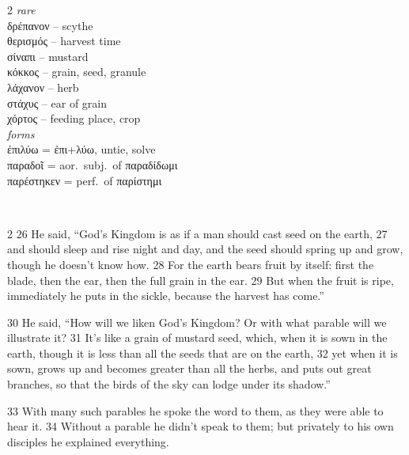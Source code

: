 \documentclass[10pt,a5paper,twoside,twocolumn]{book}
\newcommand*\cleartoleftpage{%
  \ifodd\value{page}\hbox{}\clearpage\fi
}
\newcommand{\separator}{
  \vspace{-0.5\baselineskip}%
  \hspace{0.27\textwidth}%
  \noindent\makebox[\linewidth]{\resizebox{0.3333\linewidth}{1pt}{$\bullet$}}\bigskip%
  \vspace{-0.5\baselineskip}
}
\newenvironment{facing}{\cleartoleftpage}{\clearpage\pagebreak}
\newenvironment{help}{\clearpage}{}
\newenvironment{helpsec}{\begin{minipage}[t]{\textwidth}\begin{multicols}{2}}{\end{multicols}\end{minipage}}
\newenvironment{vocab}{\begin{helpsec}}{\end{helpsec}}
\newenvironment{translation}{\separator\\\begin{helpsec}\footnotesize}{\end{helpsec}}
\begin{document}
\begin{facing}
\begin{help}
\begin{vocab}
\emph{rare}\\
δρέπανον -- scythe\\
θερισμός -- harvest time\\
σίναπι -- mustard \\
κόκκος -- grain, seed, granule\\
λάχανον -- herb\\
στάχυς -- ear of grain\\
χόρτος -- feeding place, crop\\

\emph{forms}\\
ἐπιλύω = ἐπι+λύω, untie, solve\\
παραδοῖ = aor.~subj.~of παραδίδωμι\\
παρέστηκεν = perf.~of παρίστημι\\

\end{vocab}
\begin{translation}
 26 He said, ``God's Kingdom is as if a man should cast seed on the earth, 27  and should sleep and rise night and day, and the seed should spring up and grow, though he doesn't know how. 28  For the earth bears fruit by itself: first the blade, then the ear, then the full grain in the ear. 29  But when the fruit is ripe, immediately he puts in the sickle, because the harvest has come.''

30 He said, ``How will we liken God's Kingdom? Or with what parable will we illustrate it? 31  It's like a grain of mustard seed, which, when it is sown in the earth, though it is less than all the seeds that are on the earth, 32  yet when it is sown, grows up and becomes greater than all the herbs, and puts out great branches, so that the birds of the sky can lodge under its shadow.''

33 With many such parables he spoke the word to them, as they were able to hear it. 34 Without a parable he didn't speak to them; but privately to his own disciples he explained everything. 

\end{translation}
\end{help}
\end{facing}

\end{document}
